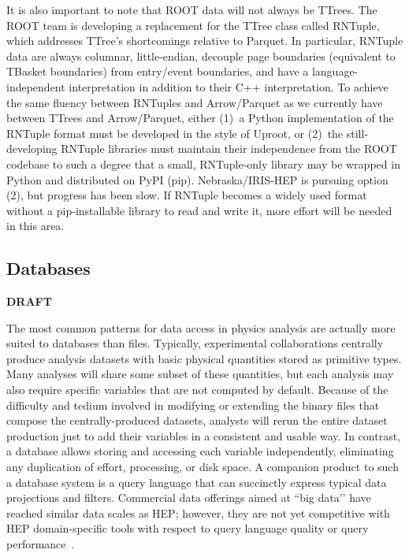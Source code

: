 \documentclass{article}
\begin{document}
It is also important to note that ROOT data will not always be TTrees. The ROOT team is developing a replacement for the TTree class called RNTuple, which addresses TTree's shortcomings relative to Parquet. In particular, RNTuple data are always columnar, little-endian, decouple page boundaries (equivalent to TBasket boundaries) from entry/event boundaries, and have a language-independent interpretation in addition to their C++ interpretation. To achieve the same fluency between RNTuples and Arrow/Parquet as we currently have between TTrees and Arrow/Parquet, either (1)~a Python implementation of the RNTuple format must be developed in the style of Uproot, or (2)~the still-developing RNTuple libraries must maintain their independence from the ROOT codebase to such a degree that a small, RNTuple-only library may be wrapped in Python and distributed on PyPI (pip). Nebraska/IRIS-HEP is pursuing option (2), but progress has been slow. If RNTuple becomes a widely used format without a pip-installable library to read and write it, more effort will be needed in this area.

\subsection{Databases}

{\bf DRAFT}

The most common patterns for data access in physics analysis are actually more suited to databases than files. Typically, experimental collaborations centrally produce analysis datasets with basic physical quantities stored as primitive types. Many analyses will share some subset of these quantities, but each analysis may also require specific variables that are not computed by default. Because of the difficulty and tedium involved in modifying or extending the binary files that compose the centrally-produced datasets, analysts will rerun the entire dataset production just to add their variables in a consistent and usable way. In contrast, a database allows storing and accessing each variable independently, eliminating any duplication of effort, processing, or disk space. A companion product to such a database system is a query language that can succinctly express typical data projections and filters. Commercial data offerings aimed at ``big data’’ have reached similar data scales as HEP; however, they are not yet competitive with HEP domain-specific tools with respect to query language quality or query performance~\cite{Graur:2021isi}.
\end{document}
